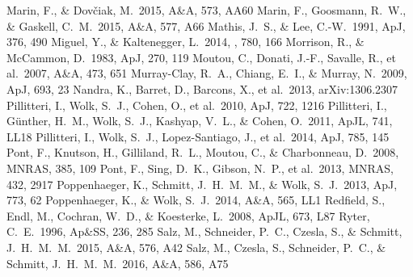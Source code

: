 \documentclass[iop]{emulateapj}
\begin{document}
\begin{thebibliography}{99}
 Marin, F., \& Dov{\v c}iak, M.\ 2015, A\&A, 573, AA60
 Marin, F., Goosmann, R.~W., \& Gaskell, C.~M.\ 2015, A\&A, 577, A66 
 Mathis, J.~S., \& Lee, C.-W.\ 1991, ApJ, 376, 490
 Miguel, Y., \& Kaltenegger, L.\ 2014, , 780, 166 
 Morrison, R., \& McCammon, D.\ 1983, ApJ, 270, 119 
 Moutou, C., Donati, J.-F., Savalle, R., et al.\ 2007, A\&A, 473, 651 
 Murray-Clay, R.~A., Chiang, E.~I., \& Murray, N.\ 2009, ApJ, 693, 23
 Nandra, K., Barret, D., Barcons, X., et al.\ 2013, arXiv:1306.2307
 Pillitteri, I., Wolk, S.~J., Cohen, O., et al.\ 2010, ApJ, 722, 1216
 Pillitteri, I., G{\"u}nther, H.~M., Wolk, S.~J., Kashyap, V.~L., \& Cohen, O.\ 2011, ApJL, 741, LL18
 Pillitteri, I., Wolk, S.~J., Lopez-Santiago, J., et al.\ 2014, ApJ, 785, 145 
 Pont, F., Knutson, H., Gilliland, R.~L., Moutou, C., \& Charbonneau, D.\ 2008, MNRAS, 385, 109
 Pont, F., Sing, D.~K., Gibson, N.~P., et al.\ 2013, MNRAS, 432, 2917
 Poppenhaeger, K., Schmitt, J.~H.~M.~M., \& Wolk, S.~J.\ 2013, ApJ, 773, 62
 Poppenhaeger, K., \& Wolk, S.~J.\ 2014, A\&A, 565, LL1 
 Redfield, S., Endl, M., Cochran, W.~D., \& Koesterke, L.\ 2008, ApJL, 673, L87
 Ryter, C.~E.\ 1996, Ap\&SS, 236, 285 
 Salz, M., Schneider, P.~C., Czesla, S., \& Schmitt, J.~H.~M.~M.\ 2015, A\&A, 576, A42 
 Salz, M., Czesla, S., Schneider, P.~C., \& Schmitt, J.~H.~M.~M.\ 2016, A\&A, 586, A75 

\end{thebibliography}
\end{document}

